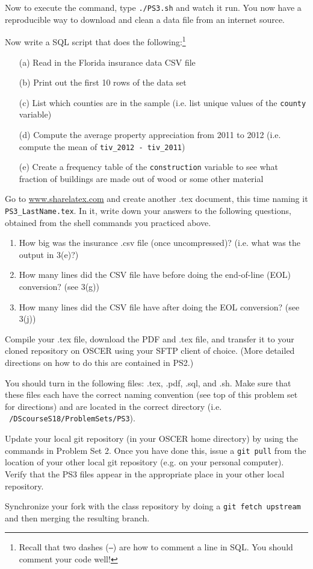 \documentclass[12pt,english]{exam}
\begin{document}
\begin{questions}
Now to execute the command, type \texttt{./PS3.sh} and watch it run. You now have a reproducible way to download and clean a data file from an internet source.

\question Now write a SQL script that does the following:\footnote{Recall that two dashes (\texttt{--}) are how to comment a line in SQL. You should comment your code well!}
\begin{itemize}
	\item[(a)] Read in the Florida insurance data CSV file
	\item[(b)] Print out the first 10 rows of the data set
	\item[(c)] List which counties are in the sample (i.e. list unique values of the \texttt{county} variable)
	\item[(d)] Compute the average property appreciation from 2011 to 2012 (i.e. compute the mean of \texttt{tiv\_2012 - tiv\_2011})
	\item[(e)] Create a frequency table of the \texttt{construction} variable to see what fraction of buildings are made out of wood or some other material
\end{itemize}

\question Go to \url{www.sharelatex.com} and create another .tex document, this time naming it \texttt{PS3\_LastName.tex}. In it, write down your answers to the following questions, obtained from the shell commands you practiced above.
\begin{enumerate}
	\item How big was the insurance .csv file (once uncompressed)? (i.e. what was the output in 3(e)?)
	\item How many lines did the CSV file have before doing the end-of-line (EOL) conversion? (see 3(g))
	\item How many lines did the CSV file have after doing the EOL conversion? (see 3(j))
\end{enumerate}

\question Compile your .tex file, download the PDF and .tex file, and transfer it to your cloned repository on OSCER using your SFTP client of choice. (More detailed directions on how to do this are contained in PS2.)

\question You should turn in the following files: .tex, .pdf, .sql, and .sh. Make sure that these files each have the correct naming convention (see top of this problem set for directions) and are located in the correct directory (i.e. \texttt{~/DScourseS18/ProblemSets/PS3}).

\question Update your local git repository (in your OSCER home directory) by using the commands in Problem Set 2. Once you have done this, issue a \texttt{git pull} from the location of your other local git repository (e.g. on your personal computer). Verify that the PS3 files appear in the appropriate place in your other local repository.

\question Synchronize your fork with the class repository by doing a \texttt{git fetch upstream} and then merging the resulting branch. 

\end{questions}
\end{document}
